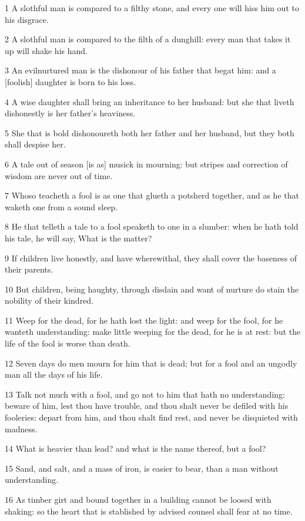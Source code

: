 \par 1 A slothful man is compared to a filthy stone, and every one will hiss him out to his disgrace.
\par 2 A slothful man is compared to the filth of a dunghill: every man that takes it up will shake his hand.
\par 3 An evilnurtured man is the dishonour of his father that begat him: and a [foolish] daughter is born to his loss.
\par 4 A wise daughter shall bring an inheritance to her husband: but she that liveth dishonestly is her father's heaviness.
\par 5 She that is bold dishonoureth both her father and her husband, but they both shall despise her.
\par 6 A tale out of season [is as] musick in mourning: but stripes and correction of wisdom are never out of time.
\par 7 Whoso teacheth a fool is as one that glueth a potsherd together, and as he that waketh one from a sound sleep.
\par 8 He that telleth a tale to a fool speaketh to one in a slumber: when he hath told his tale, he will say, What is the matter?
\par 9 If children live honestly, and have wherewithal, they shall cover the baseness of their parents.
\par 10 But children, being haughty, through disdain and want of nurture do stain the nobility of their kindred.
\par 11 Weep for the dead, for he hath lost the light: and weep for the fool, for he wanteth understanding: make little weeping for the dead, for he is at rest: but the life of the fool is worse than death.
\par 12 Seven days do men mourn for him that is dead; but for a fool and an ungodly man all the days of his life.
\par 13 Talk not much with a fool, and go not to him that hath no understanding: beware of him, lest thou have trouble, and thou shalt never be defiled with his fooleries: depart from him, and thou shalt find rest, and never be disquieted with madness.
\par 14 What is heavier than lead? and what is the name thereof, but a fool?
\par 15 Sand, and salt, and a mass of iron, is easier to bear, than a man without understanding.
\par 16 As timber girt and bound together in a building cannot be loosed with shaking: so the heart that is stablished by advised counsel shall fear at no time.
